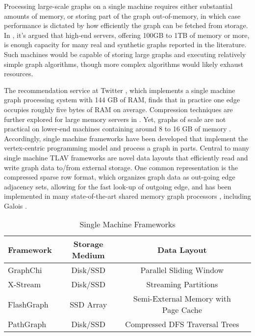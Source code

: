 \documentclass[reprint,twocolumn,showpacs,preprintnumbers,amsmath, aps,pre,amssymb]{revtex4-1}
\begin{document}
Processing large-scale graphs on a single machine requires either substantial amounts of memory, or storing part of the graph out-of-memory, in which case performance is dictated by how efficiently the graph can be fetched from storage.  In \cite{Shun2013}, it's argued that high-end servers, offering 100GB to 1TB of memory or more, is enough capacity for many real and synthetic graphs reported in the literature.  Such machines would be capable of storing large graphs and executing relatively simple graph algorithms, though more complex algorithms would likely exhaust resources.  

The recommendation service at Twitter \cite{Gupta2013}, which implements a single machine graph processing system with 144 GB of RAM, finds that in practice one edge occupies roughly five bytes of RAM on average.  Compression techniques are further explored for large memory servers in \cite{shun2015}.  Yet, graphs of scale are not practical on lower-end machines containing around 8 to 16 GB of memory \cite{Kyrola2012}.  Accordingly, single machine frameworks have been developed that implement the vertex-centric programming model and process a graph in parts.  Central to many single machine TLAV frameworks are novel data layouts that efficiently read and write graph data to/from external storage.  One common representation is the compressed sparse row format, which organizes graph data as out-going edge adjacency sets, allowing for the fast look-up of outgoing edge, and has been implemented in many state-of-the-art shared memory graph processors \cite{Pearce2010,Hong2011}, including Galois \cite{Nguyen2013}.

\begin{table*}
\centering
\small{
\begin{tabular} {l | c c l}
Framework & Storage Medium & Data Layout & \\ \hline
GraphChi & Disk/SSD & Parallel Sliding Window & \cite{Kyrola2012}\\
X-Stream & Disk/SSD & Streaming Partitions & \cite{Roy2013}\\
FlashGraph & SSD Array & Semi-External Memory with Page Cache & \cite{Zheng2015} \\
PathGraph  & Disk/SSD & Compressed DFS Traversal Trees & \cite{Yuan} \\
\end{tabular}
}
\caption{Single Machine Frameworks}
\label{table:singlemachine_frameworks}
\end{table*}
\end{document}
